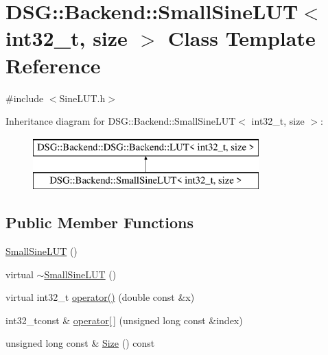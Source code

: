 \hypertarget{classDSG_1_1Backend_1_1SmallSineLUT_3_01int32__t_00_01size_01_4}{\section{D\+S\+G\+:\+:Backend\+:\+:Small\+Sine\+L\+U\+T$<$ int32\+\_\+t, size $>$ Class Template Reference}
\label{classDSG_1_1Backend_1_1SmallSineLUT_3_01int32__t_00_01size_01_4}
}


{\ttfamily \#include $<$Sine\+L\+U\+T.\+h$>$}

Inheritance diagram for D\+S\+G\+:\+:Backend\+:\+:Small\+Sine\+L\+U\+T$<$ int32\+\_\+t, size $>$\+:\begin{figure}[H]
\begin{center}
\leavevmode
\includegraphics[height=2.000000cm]{classDSG_1_1Backend_1_1SmallSineLUT_3_01int32__t_00_01size_01_4}
\end{center}
\end{figure}
\subsection*{Public Member Functions}
\begin{DoxyCompactItemize}
\item 
\hyperlink{classDSG_1_1Backend_1_1SmallSineLUT_3_01int32__t_00_01size_01_4_ad6c60ff274c31fa8aac6353b9089a8e8}{Small\+Sine\+L\+U\+T} ()
\item 
virtual \hyperlink{classDSG_1_1Backend_1_1SmallSineLUT_3_01int32__t_00_01size_01_4_a1c8fd85f2ce8d0283997096159442678}{$\sim$\+Small\+Sine\+L\+U\+T} ()
\item 
virtual int32\+\_\+t \hyperlink{classDSG_1_1Backend_1_1SmallSineLUT_3_01int32__t_00_01size_01_4_af8b347ef429ec5b6edbe7b752a003d2e}{operator()} (double const \&x)
\item 
int32\+\_\+tconst \& \hyperlink{classDSG_1_1Backend_1_1DSG_1_1Backend_1_1LUT_acd6db2fa4eba392de1cbb4795f351f8a}{operator\mbox{[}$\,$\mbox{]}} (unsigned long const \&index)
\item 
unsigned long const \& \hyperlink{classDSG_1_1Backend_1_1DSG_1_1Backend_1_1LUT_a65daa6f46f978a64da1c86089847602d}{Size} () const
\end{DoxyCompactItemize}
